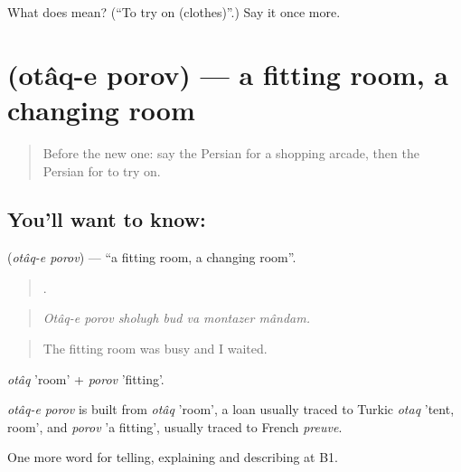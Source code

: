 \begin{tcolorbox}[breakable,colback=teal!4,colframe=teal!35!black,title={Before you move on}]
What does   mean? (\textquotedblleft{}To try on (clothes)\textquotedblright{}.) Say it once more.
\end{tcolorbox}
\section[\texorpdfstring{\fa{اتاق} \fa{پرو} (otâq-e porov)}{اتاق پرو (otâq-e porov)}]{  (otâq-e porov) — a fitting room, a changing room}

\label{lesson:FA-C460-otaq-e-porov}



\begin{quote}
Before the new one: say the Persian for a shopping arcade, then the Persian for to try on.
\end{quote}

\subsection*{You'll want to know:  }
\textbf{ } (\emph{otâq-e porov}) — \textquotedblleft{}a fitting room, a changing room\textquotedblright{}.

\begin{quote}
      .
\end{quote}

\begin{quote}
\emph{Otâq-e porov sholugh bud va montazer mândam.}
\end{quote}

\begin{quote}
The fitting room was busy and I waited.
\end{quote}

\emph{otâq} 'room' + \emph{porov} 'fitting'.

\begin{cousinweb}
\emph{otâq-e porov} is built from \emph{otâq} 'room', a loan usually traced to Turkic \emph{otaq} 'tent, room', and \emph{porov} 'a fitting', usually traced to French \emph{preuve}.
\end{cousinweb}

\begin{grammarlens}[title={What you've built}]
One more word for telling, explaining and describing at B1.
\end{grammarlens}

